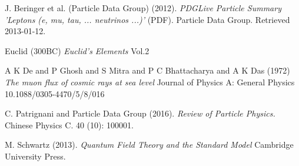 \begin{thebibliography}{99}

 J. Beringer et al. (Particle Data Group) (2012). \textit{PDGLive Particle Summary 'Leptons (e, mu, tau, ... neutrinos ...)'} (PDF). Particle Data Group. Retrieved 2013-01-12.

 Euclid (300BC) \textit{Euclid's Elements} Vol.2

 A K De and P Ghosh and S Mitra and P C Bhattacharya and A K Das (1972) \textit{The muon flux of cosmic rays at sea level} Journal of Physics A: General Physics 10.1088/0305-4470/5/8/016

 C. Patrignani and Particle Data Group (2016). \textit{Review of Particle Physics.} Chinese Physics C. 40 (10): 100001. 

 M. Schwartz (2013). \textit{Quantum Field Theory and the Standard Model} Cambridge University Press.

\end{thebibliography}

